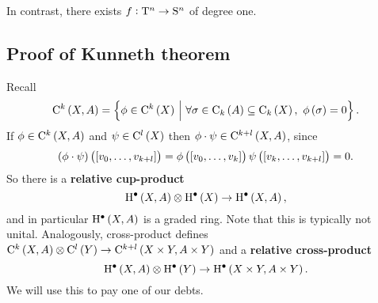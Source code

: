 \begin{exercise*}
In contrast, there exists $ f : \mathrm{T}^n \to \mathrm{S}^n $ of degree one.
\end{exercise*}

\pagebreak

\subsection{Proof of Kunneth theorem}

Recall
$$ \C^k\br{X, A} = \cbr{\phi \in \C^k\br{X} \st \forall \sigma \in \C_k\br{A} \subseteq \C_k\br{X}, \ \phi\br{\sigma} = 0}. $$
If $ \phi \in \C^k\br{X, A} $ and $ \psi \in \C^l\br{X} $ then $ \phi \cdot \psi \in \C^{k + l}\br{X, A} $, since
$$ \br{\phi \cdot \psi}\br{\sbr{v_0, \dots, v_{k + l}}} = \phi\br{\sbr{v_0, \dots, v_k}}\psi\br{\sbr{v_k, \dots, v_{k + l}}} = 0. $$
So there is a \textbf{relative cup-product}
$$ \H^\bullet\br{X, A} \otimes \H^\bullet\br{X} \to \H^\bullet\br{X, A}, $$
and in particular $ \H^\bullet\br{X, A} $ is a graded ring. Note that this is typically not unital. Analogously, cross-product defines $ \C^k\br{X, A} \otimes \C^l\br{Y} \to \C^{k + l}\br{X \times Y, A \times Y} $ and a \textbf{relative cross-product}
$$ \H^\bullet\br{X, A} \otimes \H^\bullet\br{Y} \to \H^\bullet\br{X \times Y, A \times Y}. $$
We will use this to pay one of our debts.

